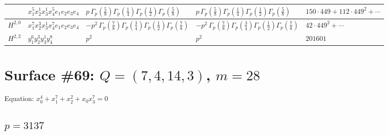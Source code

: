 \documentclass[11pt]{article}
\begin{document}
\begin{table}[ht]
{\begin{tabular}{@{}lllll@{}}
 & $x_{1}^{5} x_{2}^{1} x_{3}^{1} x_{4}^{5}  e_{1} e_{2} e_{3} e_{4}$ & $p \, \Gamma_p \left( \frac{5}{8} \right) \Gamma_p \left( \frac{1}{4} \right) \Gamma_p \left( \frac{1}{2} \right) \Gamma_p \left( \frac{5}{8} \right)$ & $p \, \Gamma_p \left( \frac{5}{8} \right) \Gamma_p \left( \frac{1}{4} \right) \Gamma_p \left( \frac{1}{2} \right) \Gamma_p \left( \frac{5}{8} \right)$ & $150{\cdot}449{+}112{\cdot}449^{2}{+}\cdots$ \\
\midrule
$H^{2,0}$ & $x_{1}^{7} x_{2}^{3} x_{3}^{1} x_{4}^{7}  e_{1} e_{2} e_{3} e_{4}$ & $- p^{2} \, \Gamma_p \left( \frac{7}{8} \right) \Gamma_p \left( \frac{3}{4} \right) \Gamma_p \left( \frac{1}{2} \right) \Gamma_p \left( \frac{7}{8} \right)$ & $- p^{2} \, \Gamma_p \left( \frac{7}{8} \right) \Gamma_p \left( \frac{3}{4} \right) \Gamma_p \left( \frac{1}{2} \right) \Gamma_p \left( \frac{7}{8} \right)$ & $42{\cdot}449^{2}{+}\cdots$ \\
\midrule
$H^{2,2}$ & $y_{1}^{6} y_{2}^{3} y_{3}^{1} y_{4}^{8}$ & $p^{2} \,$ & $p^{2} \,$ & $201601$ \\
\bottomrule
\end{tabular}
}
\renewcommand{\arraystretch}{1.0}
\end{table}

\newpage

\section*{Surface \#69: $Q=(7, 4, 14, 3)$, $m=28$}

Equation: $x_0^{4} + x_1^{7} + x_2^{2} + x_0 x_3^{7} = 0$

\subsection*{$p = 3137$}
\end{document}

